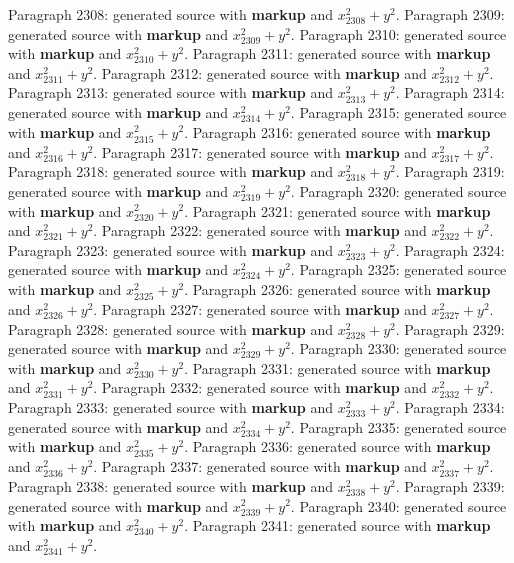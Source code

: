 \documentclass{article}
\begin{document}
Paragraph 2308: generated source with \textbf{markup} and $x_{2308}^2 + y^2$.
Paragraph 2309: generated source with \textbf{markup} and $x_{2309}^2 + y^2$.
Paragraph 2310: generated source with \textbf{markup} and $x_{2310}^2 + y^2$.
Paragraph 2311: generated source with \textbf{markup} and $x_{2311}^2 + y^2$.
Paragraph 2312: generated source with \textbf{markup} and $x_{2312}^2 + y^2$.
Paragraph 2313: generated source with \textbf{markup} and $x_{2313}^2 + y^2$.
Paragraph 2314: generated source with \textbf{markup} and $x_{2314}^2 + y^2$.
Paragraph 2315: generated source with \textbf{markup} and $x_{2315}^2 + y^2$.
Paragraph 2316: generated source with \textbf{markup} and $x_{2316}^2 + y^2$.
Paragraph 2317: generated source with \textbf{markup} and $x_{2317}^2 + y^2$.
Paragraph 2318: generated source with \textbf{markup} and $x_{2318}^2 + y^2$.
Paragraph 2319: generated source with \textbf{markup} and $x_{2319}^2 + y^2$.
Paragraph 2320: generated source with \textbf{markup} and $x_{2320}^2 + y^2$.
Paragraph 2321: generated source with \textbf{markup} and $x_{2321}^2 + y^2$.
Paragraph 2322: generated source with \textbf{markup} and $x_{2322}^2 + y^2$.
Paragraph 2323: generated source with \textbf{markup} and $x_{2323}^2 + y^2$.
Paragraph 2324: generated source with \textbf{markup} and $x_{2324}^2 + y^2$.
Paragraph 2325: generated source with \textbf{markup} and $x_{2325}^2 + y^2$.
Paragraph 2326: generated source with \textbf{markup} and $x_{2326}^2 + y^2$.
Paragraph 2327: generated source with \textbf{markup} and $x_{2327}^2 + y^2$.
Paragraph 2328: generated source with \textbf{markup} and $x_{2328}^2 + y^2$.
Paragraph 2329: generated source with \textbf{markup} and $x_{2329}^2 + y^2$.
Paragraph 2330: generated source with \textbf{markup} and $x_{2330}^2 + y^2$.
Paragraph 2331: generated source with \textbf{markup} and $x_{2331}^2 + y^2$.
Paragraph 2332: generated source with \textbf{markup} and $x_{2332}^2 + y^2$.
Paragraph 2333: generated source with \textbf{markup} and $x_{2333}^2 + y^2$.
Paragraph 2334: generated source with \textbf{markup} and $x_{2334}^2 + y^2$.
Paragraph 2335: generated source with \textbf{markup} and $x_{2335}^2 + y^2$.
Paragraph 2336: generated source with \textbf{markup} and $x_{2336}^2 + y^2$.
Paragraph 2337: generated source with \textbf{markup} and $x_{2337}^2 + y^2$.
Paragraph 2338: generated source with \textbf{markup} and $x_{2338}^2 + y^2$.
Paragraph 2339: generated source with \textbf{markup} and $x_{2339}^2 + y^2$.
Paragraph 2340: generated source with \textbf{markup} and $x_{2340}^2 + y^2$.
Paragraph 2341: generated source with \textbf{markup} and $x_{2341}^2 + y^2$.
\end{document}
